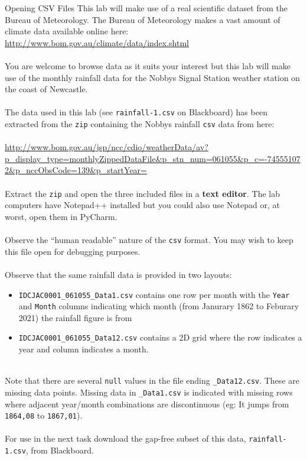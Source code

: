 \documentclass{lab}
\begin{document}
\begin{task}{Opening CSV Files}{}
This lab will make use of a real scientific dataset from the Bureau of Meteorology. The Bureau of Meteorology makes a vast amount of climate data available online here: \url{http://www.bom.gov.au/climate/data/index.shtml}
\\~\\
You are welcome to browse data as it suits your interest but this lab will make use of the monthly rainfall data for the Nobbys Signal Station weather station on the coast of Newcastle.
\\~\\
The data used in this lab (see \texttt{rainfall-1.csv} on Blackboard) has been extracted from the \texttt{zip} containing the Nobbys rainfall \texttt{csv} data from here:\\~\\ \url{http://www.bom.gov.au/jsp/ncc/cdio/weatherData/av?p_display_type=monthlyZippedDataFile&p_stn_num=061055&p_c=-745551072&p_nccObsCode=139&p_startYear=}
\\~\\
Extract the \texttt{zip} and open the three included files in a \textbf{text editor}. The lab computers have Notepad++ installed but you could also use Notepad or, at worst, open them in PyCharm.
\\~\\
Observe the ``human readable'' nature of the \texttt{csv} format. You may wish to keep this file open for debugging purposes.
\\~\\
Observe that the same rainfall data is provided in two layouts:\\
\begin{itemize}
\item \texttt{IDCJAC0001\_061055\_Data1.csv} contains one row per month with the \texttt{Year} and \texttt{Month} columns indicating which month (from Janurary 1862 to Feburary 2021) the rainfall figure is from
\item \texttt{IDCJAC0001\_061055\_Data12.csv} contains a 2D grid where the row indicates a year and column indicates a month.
\end{itemize}
~\\
Note that there are several \texttt{null} values in the file ending \texttt{\_Data12.csv}. These are missing data points. Missing data in \texttt{\_Data1.csv} is indicated with missing rows where adjacent year/month combinations are discontinuous (eg: It jumps from \texttt{1864,08} to \texttt{1867,01}).
\\~\\
For use in the next task download the gap-free subset of this data, \texttt{rainfall-1.csv}, from Blackboard.
\end{task}
\end{document}
